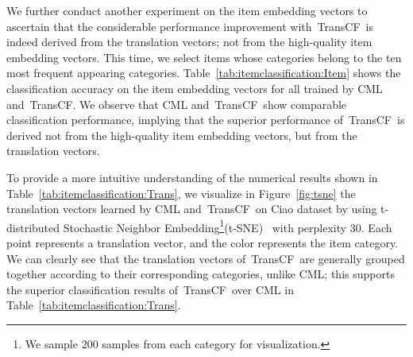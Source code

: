 \documentclass[conference]{IEEEtran}
\newcommand{\propose}{\textsf{{TransCF}}}
\begin{document}
We further conduct another experiment on the item embedding vectors  to ascertain that the considerable performance improvement with~\propose~is indeed derived from the translation vectors; not from the high-quality item embedding vectors. This time, we select items whose categories belong to the ten most frequent appearing categories. Table~\ref{tab:itemclassification:Item} shows the classification accuracy on the item embedding vectors  for all  trained by CML and~\propose. We observe that CML and~\propose~show comparable classification performance, implying that the superior performance of~\propose~is derived not from the high-quality item embedding vectors, but from the translation vectors.

To provide a more intuitive understanding of the numerical results shown in Table~\ref{tab:itemclassification:Trans}, we visualize in Figure~\ref{fig:tsne} the translation vectors learned by CML and~\propose~on Ciao dataset by using t-distributed Stochastic Neighbor Embedding\footnote{We sample 200 samples from each category for visualization.}(t-SNE)~\cite{maaten2008visualizing} with perplexity 30. Each point represents a translation vector, and the color represents the item category. We can clearly see that the translation vectors of~\propose~are generally grouped together according to their corresponding categories, unlike CML; this supports the superior classification results of~\propose~over CML in Table~\ref{tab:itemclassification:Trans}.
\end{document}
